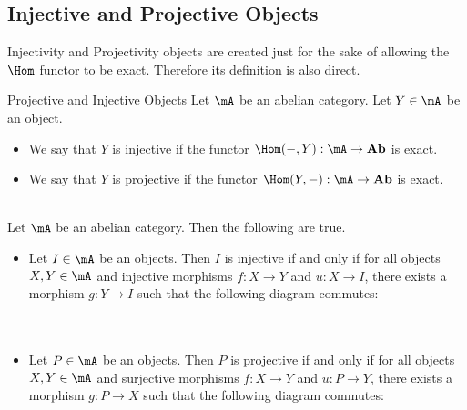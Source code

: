 \documentclass[a4paper]{article}
\begin{document}
\subsection{Injective and Projective Objects}
Injectivity and Projectivity objects are created just for the sake of allowing the $\Hom$ functor to be exact. Therefore its definition is also direct. 

\begin{defn}{Projective and Injective Objects}{} Let $\mA$ be an abelian category. Let $Y\in\mA$ be an object. 
\begin{itemize}
\item We say that $Y$ is injective if the functor $\Hom(-,Y):\mA\to\bold{Ab}$ is exact. 
\item We say that $Y$ is projective if the functor $\Hom(Y,-):\mA\to\bold{Ab}$ is exact. 
\end{itemize}
\end{defn}

\begin{lmm}{}{}\\
Let $\mA$ be an abelian category. Then the following are true. 
\begin{itemize}
\item Let $I\in\mA$ be an objects. Then $I$ is injective if and only if for all objects $X,Y\in\mA$ and injective morphisms $f:X\to Y$ and $u:X\to I$, there exists a morphism $g:Y\to I$ such that the following diagram commutes: \\
\\~\\
\item Let $P\in\mA$ be an objects. Then $P$ is projective if and only if for all objects $X,Y\in\mA$ and surjective morphisms $f:X\to Y$ and $u:P\to Y$, there exists a morphism $g:P\to X$ such that the following diagram commutes: \\
\\~\\
\end{itemize}
\end{lmm}
\end{document}
